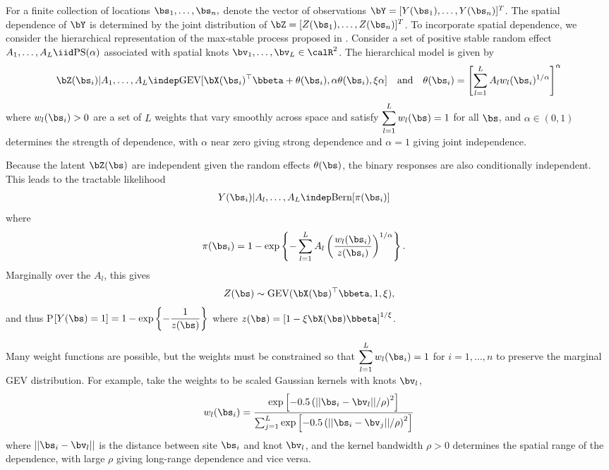 For a finite collection of locations $\bs_1, \ldots, \bs_n,$ denote the vector of observations $\bY = [Y(\bs_1), \ldots, Y(\bs_n)]^T$.
The spatial dependence of $\bY$ is determined by the joint distribution of $\bZ = [Z(\bs_1),\ldots, Z(\bs_n)]^T$.
To incorporate spatial dependence, we consider the hierarchical representation of the max-stable process proposed in \citet{Reich2012}.
Consider a set of positive stable random effect $A_1, \ldots, A_L \iid \text{PS}(\alpha)$ associated with spatial knots $\bv_1, \ldots, \bv_L \in \calR^2$.
The hierarchical model is given by
\begin{align} \label{rbeq:hiermodel}
  \bZ(\bs_i) | A_1, \ldots, A_L \indep \text{GEV}[\bX(\bs_i)^\top \bbeta + \theta(\bs_i), \alpha \theta(\bs_i), \xi \alpha] \quad \text{and} \quad \theta(\bs_i) = \left[\sum_{l = 1}^L A_l w_l (\bs_i)^{1 / \alpha} \right]^\alpha
\end{align}
where $w_{l}(\bs_i) > 0$ are a set of $L$ weights that vary smoothly across space and satisfy $\displaystyle \sum_{l = 1}^L w_l(\bs) = 1$ for all $\bs$, and $\alpha\in(0,1)$ determines the strength of dependence, with $\alpha$ near zero giving strong dependence and $\alpha=1$ giving joint independence.

Because the latent $\bZ(\bs)$ are independent given the random effects $\theta(\bs)$, the binary responses are also conditionally independent.
This leads to the tractable likelihood
\begin{align} \label{rbeq:condlike}
  Y(\bs_i) | A_l, \ldots, A_L &\indep \text{Bern}[\pi(\bs_i)]
\end{align}
where
\begin{align} \label{rbeq:pyeq1cond}
  \pi(\bs_i) &= 1 - \exp \left\{ -\displaystyle \sum_{ l = 1 }^{L} A_l \left( \frac{ w_{l}(\bs_i) }{ z(\bs_i) } \right)^{ 1/\alpha} \right\}.
\end{align}
Marginally over the $A_l$, this gives
\begin{align}
  Z(\bs) \sim \text{GEV}(\bX(\bs)^\top \bbeta, 1, \xi),
\end{align}
and thus P$[Y(\bs) = 1] = 1 - \exp\left\{-\displaystyle \frac{1}{z(\bs)}\right\}$ where $z(\bs) = \left[1 - \xi \bX(\bs) \bbeta\right]^{1 / \xi}$.

Many weight functions are possible, but the weights must be constrained so that $\displaystyle \sum_{l=1}^L w_{l}(\bs_i)=1$ for $i=1,\ldots,n$ to preserve the marginal GEV distribution.
For example, \cite{Reich2012} take the weights to be scaled Gaussian kernels with knots $\bv_l$,
\begin{align}\label{rbeq:w}
   w_{l}(\bs_i) = \frac{\exp\left[-0.5\left(||\bs_i-\bv_l||/\rho\right)^2\right]}
                 {\sum_{j=1}^L\exp\left[-0.5\left(||\bs_i-\bv_j||/\rho\right)^2\right]}
\end{align}
where $||\bs_i - \bv_l||$ is the distance between site $\bs_i$ and knot $\bv_l$, and the kernel bandwidth $\rho>0$ determines the spatial range of the dependence, with large $\rho$ giving long-range dependence and vice versa.


